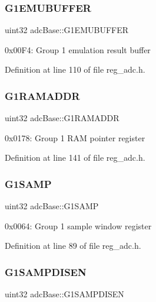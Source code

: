 \subsubsection{\texorpdfstring{G1\+E\+M\+U\+B\+U\+F\+F\+ER}{G1EMUBUFFER}}
{\footnotesize\ttfamily uint32 adc\+Base\+::\+G1\+E\+M\+U\+B\+U\+F\+F\+ER}

0x00\+F4\+: Group 1 emulation result buffer 

Definition at line 110 of file reg\+\_\+adc.\+h.

\mbox{\label{structadcBase_a5d65fa13814212751754341e12504367}} 
\subsubsection{\texorpdfstring{G1\+R\+A\+M\+A\+D\+DR}{G1RAMADDR}}
{\footnotesize\ttfamily uint32 adc\+Base\+::\+G1\+R\+A\+M\+A\+D\+DR}

0x0178\+: Group 1 R\+AM pointer register 

Definition at line 141 of file reg\+\_\+adc.\+h.

\mbox{\label{structadcBase_a4a843c194f6052e2621858f1fcd6aea2}} 
\subsubsection{\texorpdfstring{G1\+S\+A\+MP}{G1SAMP}}
{\footnotesize\ttfamily uint32 adc\+Base\+::\+G1\+S\+A\+MP}

0x0064\+: Group 1 sample window register 

Definition at line 89 of file reg\+\_\+adc.\+h.

\mbox{\label{structadcBase_abafe3c373410ea732659b19888d9cabd}} 
\subsubsection{\texorpdfstring{G1\+S\+A\+M\+P\+D\+I\+S\+EN}{G1SAMPDISEN}}
{\footnotesize\ttfamily uint32 adc\+Base\+::\+G1\+S\+A\+M\+P\+D\+I\+S\+EN}

